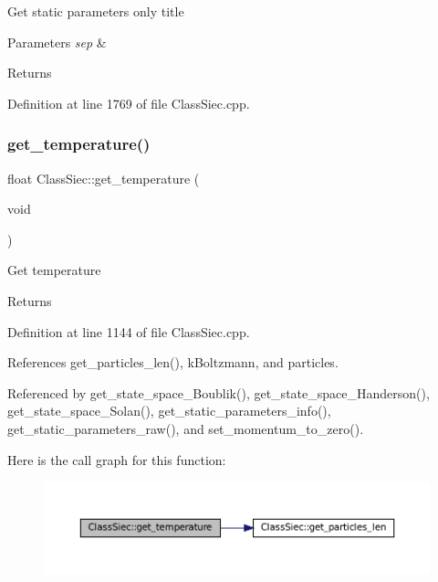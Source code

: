 Get static parameters only title 
\begin{DoxyParams}{Parameters}
{\em sep} & \\
\hline
\end{DoxyParams}
\begin{DoxyReturn}{Returns}

\end{DoxyReturn}


Definition at line 1769 of file Class\+Siec.\+cpp.

\mbox{\label{classClassSiec_ae0e08ad933601148dcd2edc998c17a61}} 
\subsubsection{\texorpdfstring{get\+\_\+temperature()}{get\_temperature()}}
{\footnotesize\ttfamily float Class\+Siec\+::get\+\_\+temperature (\begin{DoxyParamCaption}\item[{void}]{ }\end{DoxyParamCaption})}

Get temperature \begin{DoxyReturn}{Returns}

\end{DoxyReturn}


Definition at line 1144 of file Class\+Siec.\+cpp.



References get\+\_\+particles\+\_\+len(), k\+Boltzmann, and particles.



Referenced by get\+\_\+state\+\_\+space\+\_\+\+Boublik(), get\+\_\+state\+\_\+space\+\_\+\+Handerson(), get\+\_\+state\+\_\+space\+\_\+\+Solan(), get\+\_\+static\+\_\+parameters\+\_\+info(), get\+\_\+static\+\_\+parameters\+\_\+raw(), and set\+\_\+momentum\+\_\+to\+\_\+zero().

Here is the call graph for this function\+:
\nopagebreak
\begin{figure}[H]
\begin{center}
\leavevmode
\includegraphics[width=350pt]{classClassSiec_ae0e08ad933601148dcd2edc998c17a61_cgraph}
\end{center}
\end{figure}
\mbox{\label{classClassSiec_a27ab9475c3e1da5cba2c8dce28e12444}} 
